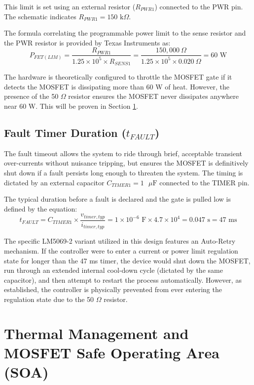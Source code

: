 \documentclass[11pt,a4paper]{article}
\begin{document}
This limit is set using an external resistor ($R_{PWR1}$) connected to the PWR pin. The schematic indicates $R_{PWR1} = 150 \text{ k}\Omega$. 

The formula correlating the programmable power limit to the sense resistor and the PWR resistor is provided by Texas Instruments as:
\begin{equation}
P_{FET(LIM)} = \frac{R_{PWR1}}{1.25 \times 10^5 \times R_{SENS1}} = \frac{150,000\ \Omega}{1.25 \times 10^5 \times 0.020\ \Omega} = 60 \text{ W}
\end{equation}

The hardware is theoretically configured to throttle the MOSFET gate if it detects the MOSFET is dissipating more than 60 W of heat. However, the presence of the 50 $\Omega$ resistor ensures the MOSFET never dissipates anywhere near 60 W. This will be proven in Section \ref{sec:soa}.

\subsection{Fault Timer Duration (\texorpdfstring{$t_{FAULT}$}{t\_FAULT})}
The fault timeout allows the system to ride through brief, acceptable transient over-currents without nuisance tripping, but ensures the MOSFET is definitively shut down if a fault persists long enough to threaten the system. The timing is dictated by an external capacitor $C_{TIMER1} = 1 \text{ }\mu\text{F}$ connected to the TIMER pin.

The typical duration before a fault is declared and the gate is pulled low is defined by the equation:
\begin{equation}
t_{FAULT} = C_{TIMER1} \times \frac{v_{timer,typ}}{i_{timer,typ}} = 1 \times 10^{-6} \text{ F} \times 4.7 \times 10^4 = 0.047 \text{ s} = 47 \text{ ms}
\end{equation}

The specific LM5069-2 variant utilized in this design features an Auto-Retry mechanism. If the controller were to enter a current or power limit regulation state for longer than the 47 ms timer, the device would shut down the MOSFET, run through an extended internal cool-down cycle (dictated by the same capacitor), and then attempt to restart the process automatically. However, as established, the controller is physically prevented from ever entering the regulation state due to the 50 $\Omega$ resistor.

\section{Thermal Management and MOSFET Safe Operating Area (SOA)}
\label{sec:soa}
\end{document}
